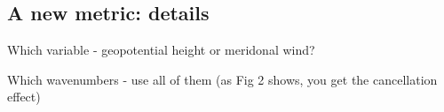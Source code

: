 \subsection{A new metric: details}

Which variable - geopotential height or meridonal wind?

Which wavenumbers - use all of them (as Fig 2 shows, you get the cancellation effect)